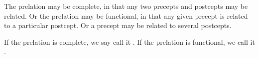 The prelation may be
complete, in that any two precepts
and postcepts may be related.
Or the prelation may
be functional, in that any given
precept is related to a particular
postcept.
Or a precept may be related
to several postcepts.

If the prelation is complete, we say
call it .
If the prelation is functional, we call
it .
\strats

